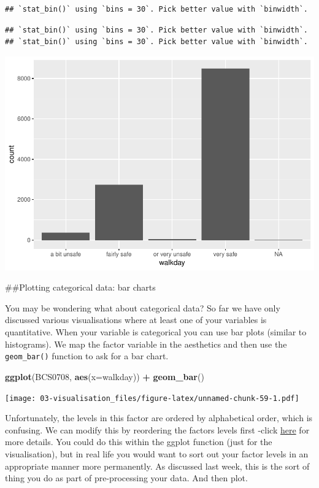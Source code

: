 \documentclass[]{book}
\newenvironment{Shaded}{\begin{snugshade}}{\end{snugshade}}
\newcommand{\DataTypeTok}[1]{\textcolor[rgb]{0.13,0.29,0.53}{#1}}
\newcommand{\KeywordTok}[1]{\textcolor[rgb]{0.13,0.29,0.53}{\textbf{#1}}}
\newcommand{\NormalTok}[1]{#1}
\newcommand{\OperatorTok}[1]{\textcolor[rgb]{0.81,0.36,0.00}{\textbf{#1}}}
\newcommand{\StringTok}[1]{\textcolor[rgb]{0.31,0.60,0.02}{#1}}
\theoremstyle{definition}
\theoremstyle{definition}
\theoremstyle{definition}
\theoremstyle{remark}
\begin{document}
\begin{verbatim}
## `stat_bin()` using `bins = 30`. Pick better value with `binwidth`.
\end{verbatim}

\begin{verbatim}
## `stat_bin()` using `bins = 30`. Pick better value with `binwidth`.
## `stat_bin()` using `bins = 30`. Pick better value with `binwidth`.
\end{verbatim}

\includegraphics{03-visualisation_files/figure-latex/unnamed-chunk-58-1.pdf}

\#\#Plotting categorical data: bar charts

You may be wondering what about categorical data? So far we have only
discussed various visualisations where at least one of your variables is
quantitative. When your variable is categorical you can use bar plots
(similar to histograms). We map the factor variable in the aesthetics
and then use the \texttt{geom\_bar()} function to ask for a bar chart.

\begin{Shaded}
\begin{Highlighting}[]
\KeywordTok{ggplot}\NormalTok{(BCS0708, }\KeywordTok{aes}\NormalTok{(}\DataTypeTok{x=}\NormalTok{walkday)) }\OperatorTok{+}
\StringTok{  }\KeywordTok{geom_bar}\NormalTok{()}
\end{Highlighting}
\end{Shaded}

\texttt{[image: 03-visualisation\_files/figure-latex/unnamed-chunk-59-1.pdf]}

Unfortunately, the levels in this factor are ordered by alphabetical
order, which is confusing. We can modify this by reordering the factors
levels first -click
\href{http://www.cookbook-r.com/Manipulating_data/Changing_the_order_of_levels_of_a_factor/}{here}
for more details. You could do this within the ggplot function (just for
the visualisation), but in real life you would want to sort out your
factor levels in an appropriate manner more permanently. As discussed
last week, this is the sort of thing you do as part of pre-processing
your data. And then plot.
\end{document}
